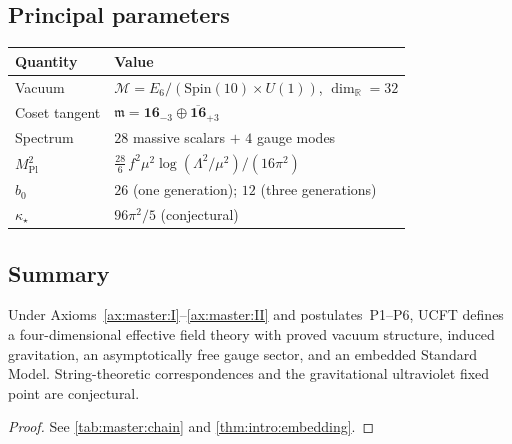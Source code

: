 \subsection{Principal parameters}
\label{sec:master:numbers}

\begin{center}
\small
\begin{tabular}{@{}ll@{}}
\toprule
Quantity & Value \\
\midrule
Vacuum & $\mathcal M=E_6/(\mathrm{Spin}(10)\times U(1))$, $\dim_{\mathbb R}=32$ \\
Coset tangent & $\mathfrak m=\mathbf{16}_{-3}\oplus\overline{\mathbf{16}}_{+3}$ \\
Spectrum & $28$ massive scalars $+$ $4$ gauge modes \\
$M_{\mathrm{Pl}}^2$ &
  $\tfrac{28}{6}\,f^2\mu^2\log(\Lambda^2/\mu^2)/(16\pi^2)$ \\
$b_0$ & $26$ (one generation); $12$ (three generations) \\
$\kappa_\star$ & $96\pi^2/5$ (conjectural) \\
\bottomrule
\end{tabular}
\end{center}

\subsection{Summary}
\label{sec:master:summary}

\begin{theorem}[Embedding]\label{thm:master:embedding}
Under Axioms~\autoref{ax:master:I}--\autoref{ax:master:II} and
postulates~\textnormal{P1--P6}, UCFT defines a four-dimensional effective field
theory with proved vacuum structure, induced gravitation, an asymptotically free
gauge sector, and an embedded Standard Model. String-theoretic correspondences
and the gravitational ultraviolet fixed point are conjectural.
\end{theorem}

\begin{proof}
See \autoref{tab:master:chain} and \autoref{thm:intro:embedding}.
\end{proof}

\clearpage